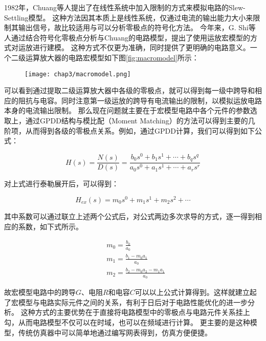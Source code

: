 1982年，Chuang等人提出了在线性系统中加入限制的方式来模拟电路的Slew-Settling模型\parencite{Chuang-Slew-1982}。
这种方法因其本质上是线性系统，仅通过电流的输出能力大小来限制其输出信号，故比较适用与可以分析零极点的符号化方法。
今年来，G. Shi等人通过结合符号化零极点分析与Chuang的电路模型\parencite{ZhangHe-Slew-2011,ZhangAilin-Slew-2015}，提出了使用运放宏模型的方式对运放进行建模。
这种方式不仅更为准确，同时提供了更明确的电路意义。一个二级运算放大器的电路宏模型如下图\ref{fig:macromodel}所示：

\begin{figure}[!htp]
	\centering
	\texttt{[image: chap3/macromodel.png]}
\end{figure}

可以看到通过提取二级运算放大器中各级的零极点，就可以得到每一级中跨导和相应的阻抗与电容。同时注意第一级运放的跨导有电流输出的限制，以模拟运放电路本身的电流输出限制。
那么现在问题就主要在于宏模型电路中各个元件的参数选取上，通过GPDD结构与模比配（Moment Matching）的方法可以得到主要的几阶项，从而得到各级的零极点关系。例如，通过GPDD计算，我们可以得到如下公式：

\begin{equation}
	H\left( s \right) = \frac{{N\left( s \right)}}
	{{D\left( s \right)}} = \frac{{{b_0}{s^0} + {b_1}{s^1} +  \cdots  + {b_q}{s^q}}}
	{{{a_0}{s^0} + {a_1}{s^1} +  \cdots  + {a_r}{s^r}}}
\end{equation}

对上式进行泰勒展开后，可以得到：

\begin{equation}
	{H_{ex}}\left( s \right) = {m_0}{s^0} + {m_1}{s^1} + {m_2}{s^2} +  \cdots
\end{equation}

其中系数可以通过联立上述两个公式后，对公式两边多次求导的方式，逐一得到相应的系数，如下式所示。

\begin{align}
	& m_0 = \frac{b_0}{a_0} \nonumber \\
	& m_1 = \frac{{b_1} - {m_0}{a_1}}{a_0} \nonumber \\
	& m_2 = \frac{{b_2} - {m_0}{a_2} - {m_1}{a_1}}{a_0} 
\end{align}

故宏模型电路中的跨导$G$、电阻$R$和电容$C$可以以上公式计算得到。这样就建立起了宏模型与电路实际元件之间的关系，有利于日后对于电路性能优化的进一步分析。
这种方式的主要优势在于直接将电路模型中的零极点与电路元件关系挂上勾，从而电路模型不仅可以在时域，也可以在频域进行计算。
更主要的是这种模型，传统仿真器中可以简单地通过编写网表得到，仿真方便便捷。

